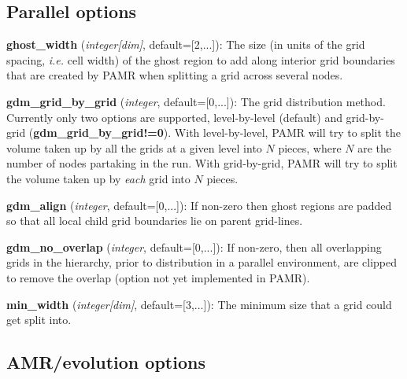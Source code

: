 \documentclass[aps,amssymb,unsortedaddress,nofootinbib]{revtex4}
\def\lsep{\itemsep 0.05in}
\begin{document}
\subsection{Parallel options}

\begin{list}{}{\lsep}
\item {\bf ghost\_width} ({\em integer[dim]}, default=[2,...]):
      The size (in units of the grid spacing, {\it i.e.} cell width) of the 
      ghost region to add along interior grid 
      boundaries that are created by PAMR when splitting a grid across several nodes.
\item {\bf gdm\_grid\_by\_grid} ({\em integer}, default=[0,...]):
      The grid distribution method. Currently only two options are supported,
      level-by-level (default) and grid-by-grid ({\bf gdm\_grid\_by\_grid!=0}). 
      With level-by-level, PAMR will try to split the volume taken up by all 
      the grids at a given level into $N$ pieces, where $N$ are the number of 
      nodes partaking in the run. With grid-by-grid, PAMR will try to split 
      the volume taken up by {\em each} grid into $N$ pieces.
\item {\bf gdm\_align} ({\em integer}, default=[0,...]):
      If non-zero then ghost regions are padded so that all local child grid
      boundaries lie on parent grid-lines.
\item {\bf gdm\_no\_overlap} ({\em integer}, default=[0,...]):
      If non-zero, then all overlapping grids in the hierarchy, prior to distribution
      in a parallel environment, are clipped to remove the overlap (option 
      not yet implemented in PAMR).
\item {\bf min\_width} ({\em integer[dim]}, default=[3,...]):
      The minimum size that a grid could get split into.
\end{list}

\subsection{AMR/evolution options}\label{sec_amr_ops}
\end{document}
